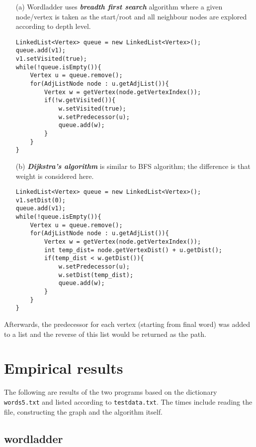 \documentclass{article}
\newcommand{\code}[1]{\texttt{#1}}
\begin{document}
\begin{itemize}
\item[(a)] 
Wordladder uses \textbf{\textit{breadth first search}} algorithm where a given node/vertex is taken as the start/root and all neighbour nodes are explored according to depth level.

\begin{verbatim}
LinkedList<Vertex> queue = new LinkedList<Vertex>();
queue.add(v1);
v1.setVisited(true);
while(!queue.isEmpty()){
	Vertex u = queue.remove();
	for(AdjListNode node : u.getAdjList()){
		Vertex w = getVertex(node.getVertexIndex());
		if(!w.getVisited()){
			w.setVisited(true);
			w.setPredecessor(u);
			queue.add(w);
		}
	}
}
\end{verbatim}

\item[(b)]
\textbf{\textit{Dijkstra's algorithm}} is similar to BFS algorithm; the difference is that weight is considered here.
\begin{verbatim}
LinkedList<Vertex> queue = new LinkedList<Vertex>();
v1.setDist(0);
queue.add(v1);
while(!queue.isEmpty()){
	Vertex u = queue.remove();
	for(AdjListNode node : u.getAdjList()){
		Vertex w = getVertex(node.getVertexIndex());
		int temp_dist= node.getVertexDist() + u.getDist();
		if(temp_dist < w.getDist()){
			w.setPredecessor(u);
			w.setDist(temp_dist);
			queue.add(w);
		}
	}
}
\end{verbatim}

\end{itemize}

\noindent Afterwards, the predecessor for each vertex (starting from final word) was added to a list and the reverse of this list would be returned as the path.

\vspace{0.5cm}

\section*{Empirical results}

The following are results of the two programs based on the dictionary \code{words5.txt} and listed according to \code{testdata.txt}. The times include reading the file, constructing the graph and the algorithm itself.

\vspace{0.2cm}

\subsection*{wordladder}
\end{document}
